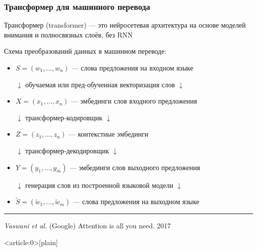 \documentclass[fullscreen=true, bookmarks=true, hyperref={pdfencoding=unicode}]{beamer}
\begin{document}
\begin{frame}
  \frametitle{Трансформер для машинного перевода}

  Трансформер (transformer) — это нейросетевая архитектура на основе моделей внимания и полносвязных слоёв, без RNN

  Схема преобразований данных в машинном переводе:

  \begin{itemize}
    \item $S = (w_1, \dots, w_n)$ — слова предложения на входном языке

          $\downarrow$ обучаемая или пред-обученная векторизация слов $\downarrow$
    \item $X = (x_1, \dots, x_n)$ — эмбединги слов входного предложения

          $\downarrow$ трансформер-кодировщик $\downarrow$
    \item $Z = (z_1, \dots, z_n)$ — контекстные эмбединги

          $\downarrow$ трансформер-декодировщик $\downarrow$
    \item $Y = (y_1, \dots, y_m)$ — эмбединги слов выходного предложения

          $\downarrow$ генерация слов из построенной языковой модели $\downarrow$
    \item $\tilde S = (\tilde w_1, \dots, \tilde w_m)$ — слова предложения на выходном языке
  \end{itemize}

  \noindent\rule{8cm}{0.4pt}

  {\small
  {\it Vaswani et al.} (Google) Attention is all you need. 2017}
\end{frame}


{ %
    \begin{frame}<article:0>[plain]
     \end{frame}
}
\end{document}
